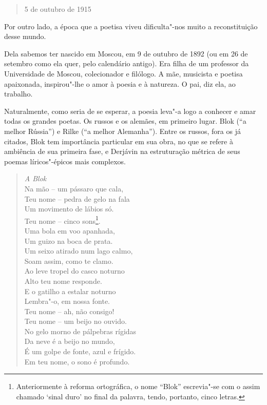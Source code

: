 {{{\begin{verse}
5 de outubro de 1915

\end{verse}

Por outro lado, a época que a poetisa viveu dificulta"-nos muito a
reconstituição desse mundo.

Dela sabemos ter nascido em Moscou, em 9 de outubro de 1892 (ou em 26 de
setembro como ela quer, pelo calendário antigo). Era filha de um
professor da Universidade de Moscou, colecionador e filólogo. A mãe,
musicista e poetisa apaixonada, inspirou"-lhe o amor à poesia e à
natureza. O pai, diz ela, ao trabalho.

Naturalmente, como seria de se esperar, a poesia leva"-a logo a conhecer
e amar todas os grandes poetas. Os russos e os alemães, em primeiro
lugar. Blok (``a melhor Rússia'') e Rilke (``a melhor Alemanha''). Entre
os russos, fora os já citados, Blok tem importância particular em sua
obra, no que se refere à ambiência de sua primeira fase, e Derjávin na
estruturação métrica de seus poemas líricos"-épicos mais complexos.

\begin{verse}
\emph{A Blok} \\[8pt]
Na mão -- um pássaro que cala, \\
Teu nome -- pedra de gelo na fala \\
Um movimento de lábios só. \\[8pt]
Teu nome -- cinco sons\footnote{Anteriormente à reforma ortográfica, o
  nome ``Blok'' escrevia"-se com o assim chamado `sinal duro' no final da
  palavra, tendo, portanto, cinco letras.}. \\
Uma bola em voo apanhada, \\
Um guizo na boca de prata. \\
Um seixo atirado num lago calmo, \\
Soam assim, como te clamo. \\
Ao leve tropel do casco noturno \\
Alto teu nome responde. \\
E o gatilho a estalar noturno \\
Lembra"-o, em nossa fonte. \\[8pt]
Teu nome -- ah, não consigo! \\
Teu nome -- um beijo no ouvido. \\
No gelo morno de pálpebras rígidas \\
Da neve é a beijo no mundo, \\
É um golpe de fonte, azul e frígido. \\
Em teu nome, o sono é profundo. 


\end{verse}}}}
